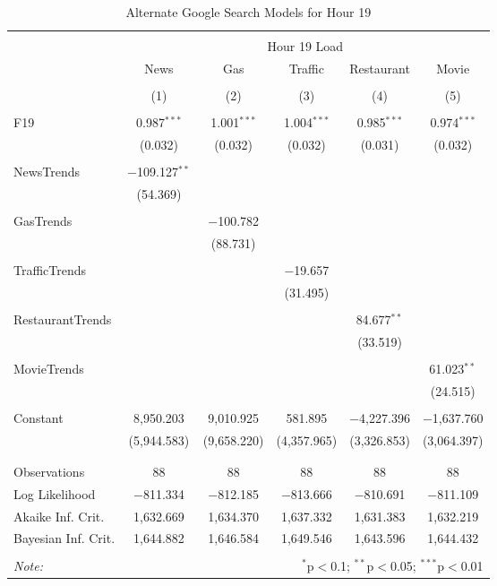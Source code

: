 \documentclass{article}
\begin{document}
\begin{table}[!htbp] \centering 
  \caption{Alternate Google Search Models for Hour 19} 
  \label{} 
\begin{tabular}{@{\extracolsep{5pt}}lccccc} 
\\[-1.8ex]\hline 
\hline \\[-1.8ex] 
 & \multicolumn{5}{c}{Hour 19 Load} \\ 
\cline{2-6} 
 & News & Gas & Traffic & Restaurant & Movie \\ 
\\[-1.8ex] & (1) & (2) & (3) & (4) & (5)\\ 
\hline \\[-1.8ex] 
 F19 & 0.987$^{***}$ & 1.001$^{***}$ & 1.004$^{***}$ & 0.985$^{***}$ & 0.974$^{***}$ \\ 
  & (0.032) & (0.032) & (0.032) & (0.031) & (0.032) \\ 
  & & & & & \\ 
 NewsTrends & $-$109.127$^{**}$ &  &  &  &  \\ 
  & (54.369) &  &  &  &  \\ 
  & & & & & \\ 
 GasTrends &  & $-$100.782 &  &  &  \\ 
  &  & (88.731) &  &  &  \\ 
  & & & & & \\ 
 TrafficTrends &  &  & $-$19.657 &  &  \\ 
  &  &  & (31.495) &  &  \\ 
  & & & & & \\ 
 RestaurantTrends &  &  &  & 84.677$^{**}$ &  \\ 
  &  &  &  & (33.519) &  \\ 
  & & & & & \\ 
 MovieTrends &  &  &  &  & 61.023$^{**}$ \\ 
  &  &  &  &  & (24.515) \\ 
  & & & & & \\ 
 Constant & 8,950.203 & 9,010.925 & 581.895 & $-$4,227.396 & $-$1,637.760 \\ 
  & (5,944.583) & (9,658.220) & (4,357.965) & (3,326.853) & (3,064.397) \\ 
  & & & & & \\ 
\hline \\[-1.8ex] 
Observations & 88 & 88 & 88 & 88 & 88 \\ 
Log Likelihood & $-$811.334 & $-$812.185 & $-$813.666 & $-$810.691 & $-$811.109 \\ 
Akaike Inf. Crit. & 1,632.669 & 1,634.370 & 1,637.332 & 1,631.383 & 1,632.219 \\ 
Bayesian Inf. Crit. & 1,644.882 & 1,646.584 & 1,649.546 & 1,643.596 & 1,644.432 \\ 
\hline 
\hline \\[-1.8ex] 
\textit{Note:}  & \multicolumn{5}{r}{$^{*}$p$<$0.1; $^{**}$p$<$0.05; $^{***}$p$<$0.01} \\ 
\end{tabular} 
\end{table} 
\end{document}
